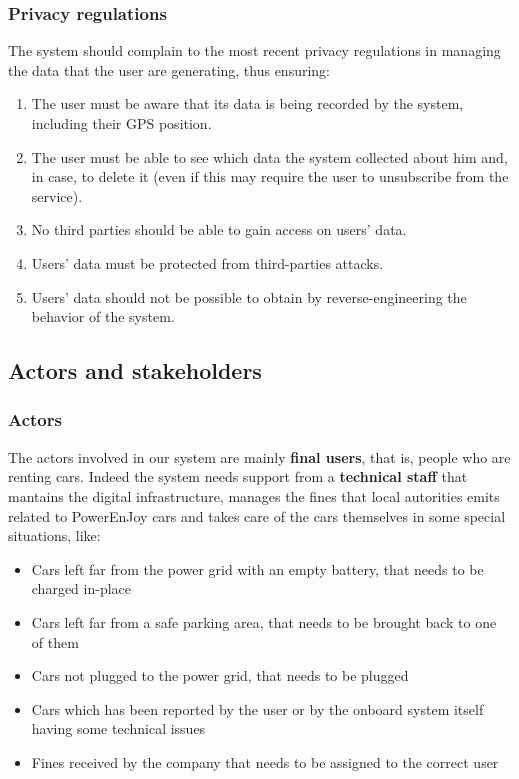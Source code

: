 \documentclass[11pt]{article} %
\newcommand{\pe}{PowerEnJoy }
\begin{document}
	\subsubsection{Privacy regulations}
The system should complain to the most recent privacy regulations in managing the data that the user are generating, thus ensuring:
\begin{enumerate}
	\item The user must be aware that its data is being recorded by the system, including their GPS position.
	\item The user must be able to see which data the system collected about him and, in case, to delete it (even if this may require the user to unsubscribe from the service).
	\item No third parties should be able to gain access on users' data.
	\item Users' data must be protected from third-parties attacks.
	\item Users' data should not be possible to obtain by reverse-engineering the behavior of the system.
\end{enumerate}

\subsection{Actors and stakeholders}

\subsubsection{Actors}
The actors involved in our system are mainly \textbf{final users}, that is, people who are renting cars. Indeed the system needs support from a \textbf{technical staff} that mantains the digital infrastructure, manages the fines that local autorities emits related to \pe cars and takes care of the cars themselves in some special situations, like:
\begin{itemize} 
	\item Cars left far from the power grid with an empty battery, that needs to be charged in-place
	\item Cars left far from a safe parking area, that needs to be brought back to one of them
	\item Cars not plugged to the power grid, that needs to be plugged
	\item Cars which has been reported by the user or by the onboard system itself having some technical issues
	\item Fines received by the company that needs to be assigned to the correct user
\end{itemize}
\end{document}
